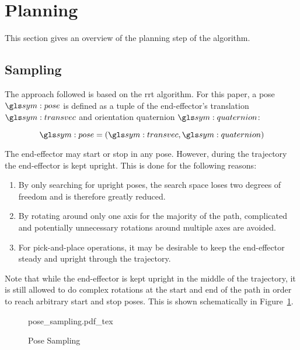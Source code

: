 \section{Planning}

	This section gives an overview of the planning step of the algorithm.

	\subsection{Sampling}

		The approach followed is based on the \gls{rrt}  algorithm.
		For this paper, a pose $\pose$ is defined as a tuple of the
		end-effector's translation $\transvec$ and orientation quaternion
		$\quaternion$:

		\begin{equation}
			\pose = (\transvec, \quaternion)
		\end{equation}

		The end-effector may start or stop in any pose. However, during the
		trajectory the end-effector is kept upright. This is done for the
		following reasons:

		\begin{enumerate}

			\item

				By only searching for upright poses, the search space loses two
				degrees of freedom and is therefore greatly reduced.

			\item

				By rotating around only one axis for the majority of the path,
				complicated and potentially unnecessary rotations around
				multiple axes are avoided.

			\item

				For pick-and-place operations, it may be desirable to keep the
				end-effector steady and upright through the trajectory.

		\end{enumerate}

		Note that while the end-effector is kept upright in the middle of the
		trajectory, it is still allowed to do complex rotations at the start and
		end of the path in order to reach arbitrary start and stop poses. This
		is shown schematically in Figure~\ref{fig:pose_sampling}.

		\begin{figure}[hb]
			\centering
			\def\svgwidth{\columnwidth}
			{pose_sampling.pdf_tex}
			\caption{Pose Sampling}%
			\label{fig:pose_sampling}
		\end{figure}

